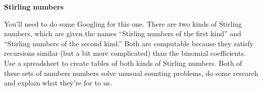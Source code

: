 {\bf Stirling numbers}

You'll need to do some Googling for this one.  There are two kinds of Stirling numbers, which are given the names 
``Stirling numbers of the first kind'' and ``Stirling numbers of the second kind.''  Both are computable because they satisfy recursions similar (but a bit more complicated) than the binomial coefficients.  Use a spreadsheet to create tables of both kinds of Stirling numbers.  Both of these sets of numbers numbers solve unusual counting problems, do some research and explain what they're for to us.